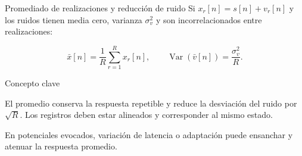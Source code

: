 \documentclass[
  10pt,
  ignorenonframetext,
  aspectratio=169,
  spanish,
]{beamer}
\begin{document}
\begin{frame}{Promediado de realizaciones y reducción de ruido}
\label{d1-034}
Si \(x_r[n]=s[n]+v_r[n]\) y los ruidos tienen media cero, varianza
\(\sigma_v^2\) y son incorrelacionados entre realizaciones:

\[\bar x[n]=\frac1R\sum_{r=1}^{R}x_r[n],\qquad
\operatorname{Var}(\bar v[n])=\frac{\sigma_v^2}{R}.\]

\begin{block}{Concepto clave}

El promedio conserva la respuesta repetible y reduce la desviación del
ruido por \(\sqrt R\). Los registros deben estar alineados y
corresponder al mismo estado.

\end{block}

En potenciales evocados, variación de latencia o adaptación puede
ensanchar y atenuar la respuesta promedio.

\end{frame}
\end{document}
